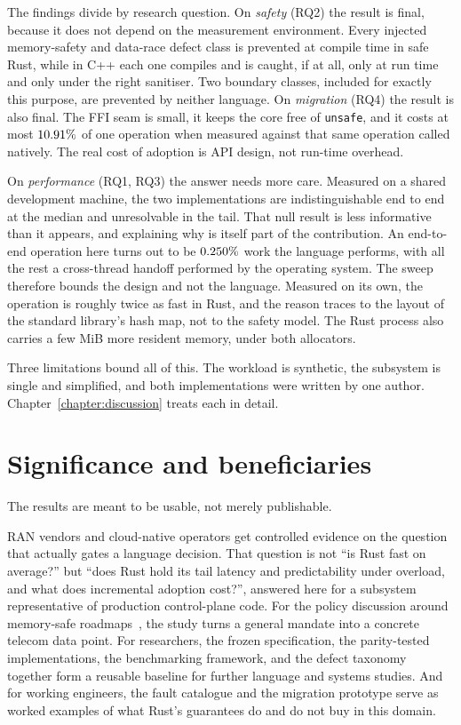 \documentclass[english,twoside,openright,a4paper,censored,csm,software-track-2020]{HYthesisML}
\begin{document}
The findings divide by research question. On \emph{safety} (RQ2) the result is final, because
it does not depend on the measurement environment. Every injected memory-safety and data-race
defect class is prevented at compile time in safe Rust, while in C++ each one compiles and is
caught, if at all, only at run time and only under the right sanitiser. Two boundary classes,
included for exactly this purpose, are prevented by neither language. On \emph{migration} (RQ4)
the result is also final. The FFI seam is small, it keeps the core free of \texttt{unsafe}, and
it costs at most $10.91\%$ of one operation when measured against that same operation
called natively. The real cost of adoption is API design, not run-time overhead.

On \emph{performance} (RQ1, RQ3) the answer needs more care. Measured on a shared development
machine, the two implementations are indistinguishable end to end at the median and
unresolvable in the tail. That null result is less informative than it appears, and explaining
why is itself part of the contribution. An end-to-end operation here turns out to be
$0.250\%$ work the language performs, with all the rest a cross-thread handoff
performed by the operating system. The sweep therefore bounds the design and not the language.
Measured on its own, the operation is roughly twice as fast in Rust, and the reason traces to
the layout of the standard library's hash map, not to the safety model. The Rust process also
carries a few MiB more resident memory, under both allocators.

Three limitations bound all of this. The workload is synthetic, the subsystem is single and
simplified, and both implementations were written by one author.
Chapter~\ref{chapter:discussion} treats each in detail.

\section{Significance and beneficiaries}
The results are meant to be usable, not merely publishable.

RAN vendors and cloud-native operators get controlled evidence on the question that actually
gates a language decision. That question is not ``is Rust fast on average?'' but ``does Rust
hold its tail latency and predictability under overload, and what does incremental adoption
cost?'', answered here for a subsystem representative of production control-plane code. For the
policy discussion around memory-safe roadmaps~\cite{cisa2023memorysafe,oncd2024building}, the
study turns a general mandate into a concrete telecom data point. For researchers, the frozen
specification, the parity-tested implementations, the benchmarking framework, and the defect
taxonomy together form a reusable baseline for further language and systems studies. And for
working engineers, the fault catalogue and the migration prototype serve as worked examples of
what Rust's guarantees do and do not buy in this domain.
\end{document}
